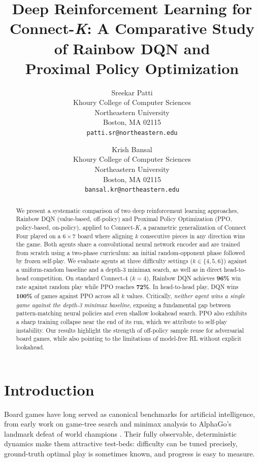 \documentclass[10pt, letterpaper, twocolumn]{article}
\title{\textbf{Deep Reinforcement Learning for Connect-\textit{K}:
       A Comparative Study of Rainbow DQN and\\
       Proximal Policy Optimization}}
\author{%
  Sreekar Patti\\
  Khoury College of Computer Sciences\\
  Northeastern University\\
  Boston, MA 02115\\
  \texttt{patti.sr@northeastern.edu}
  \and
  Krish Bansal\\
  Khoury College of Computer Sciences\\
  Northeastern University\\
  Boston, MA 02115\\
  \texttt{bansal.kr@northeastern.edu}
}
\date{}
\begin{document}
\maketitle

\begin{abstract}
We present a systematic comparison of two deep reinforcement learning
approaches, Rainbow DQN (value-based, off-policy) and Proximal Policy
Optimization (PPO, policy-based, on-policy), applied to
Connect-\textit{K}, a parametric generalization of Connect Four played
on a $6{\times}7$ board where aligning $k$ consecutive pieces in any
direction wins the game.  Both agents share a convolutional neural
network encoder and are trained from scratch using a two-phase
curriculum: an initial random-opponent phase followed by frozen
self-play.  We evaluate agents at three difficulty settings ($k \in
\{4,5,6\}$) against a uniform-random baseline and a depth-3 minimax
search, as well as in direct head-to-head competition.  On standard
Connect-4 ($k{=}4$), Rainbow DQN achieves \textbf{96\%} win rate
against random play while PPO reaches \textbf{72\%}.  In head-to-head
play, DQN wins \textbf{100\%} of games against PPO across all $k$
values.  Critically, \emph{neither agent wins a single game against the
depth-3 minimax baseline}, exposing a fundamental gap between
pattern-matching neural policies and even shallow lookahead search.  PPO
also exhibits a sharp training collapse near the end of its run, which
we attribute to self-play instability.  Our results highlight the
strength of off-policy sample reuse for adversarial board games, while
also pointing to the limitations of model-free RL without explicit
lookahead.
\end{abstract}

\section{Introduction}
\label{sec:intro}

Board games have long served as canonical benchmarks for artificial
intelligence, from early work on game-tree search and minimax analysis
\citep{knuth1975alphabeta} to AlphaGo's landmark defeat of world champions
\citep{silver2016alphago}.  Their fully observable, deterministic
dynamics make them attractive test-beds: difficulty can be tuned
precisely, ground-truth optimal play is sometimes known, and progress is
easy to measure.
\end{document}
